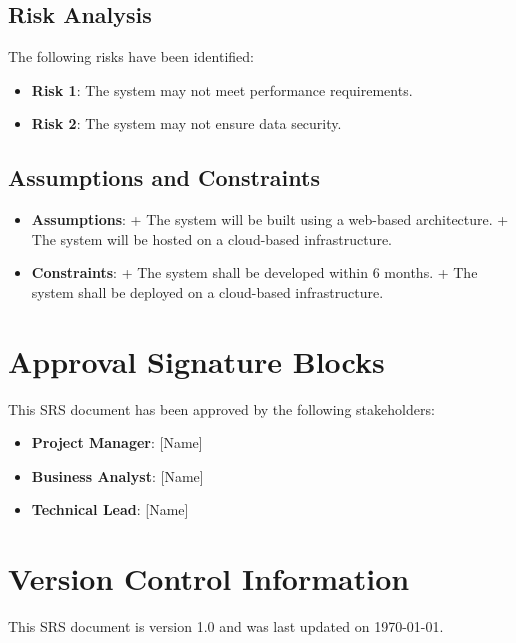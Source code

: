 \documentclass{article}
\begin{document}
\subsection{Risk Analysis}
The following risks have been identified:
\begin{itemize}
\item \textbf{Risk 1}: The system may not meet performance requirements.
\item \textbf{Risk 2}: The system may not ensure data security.
\end{itemize}

\subsection{Assumptions and Constraints}
\begin{itemize}
\item \textbf{Assumptions}:
+ The system will be built using a web-based architecture.
+ The system will be hosted on a cloud-based infrastructure.
\item \textbf{Constraints}:
+ The system shall be developed within 6 months.
+ The system shall be deployed on a cloud-based infrastructure.
\end{itemize}

\section{Approval Signature Blocks}
This SRS document has been approved by the following stakeholders:

\begin{itemize}
\item \textbf{Project Manager}: [Name]
\item \textbf{Business Analyst}: [Name]
\item \textbf{Technical Lead}: [Name]
\end{itemize}

\section{Version Control Information}
This SRS document is version 1.0 and was last updated on \today.
\end{document}
